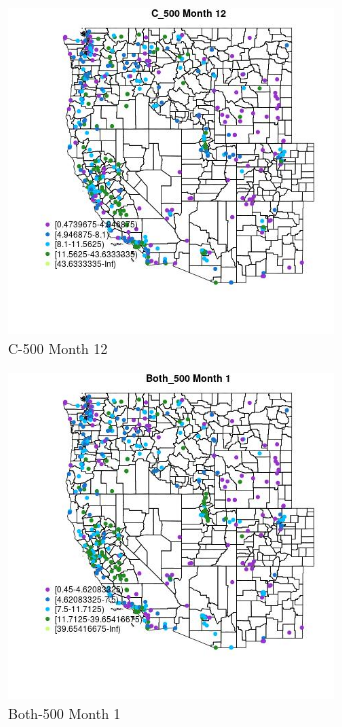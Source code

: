 \begin{figure} 
\centering  
\includegraphics[width=0.77\textwidth]{Code_Outputs/ML_input_report_ML_input_PM25_Step5_part_d_de_duplicated_aves_ML_input_MapObsMo12C_500.jpg} 
\caption{\label{fig:ML_input_report_ML_input_PM25_Step5_part_d_de_duplicated_aves_ML_inputMapObsMo12C_500}C-500 Month 12} 
\end{figure} 
 

\begin{figure} 
\centering  
\includegraphics[width=0.77\textwidth]{Code_Outputs/ML_input_report_ML_input_PM25_Step5_part_d_de_duplicated_aves_ML_input_MapObsMo1Both_500.jpg} 
\caption{\label{fig:ML_input_report_ML_input_PM25_Step5_part_d_de_duplicated_aves_ML_inputMapObsMo1Both_500}Both-500 Month 1} 
\end{figure} 
 

